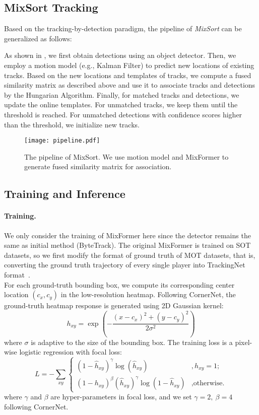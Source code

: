 \documentclass[10pt,twocolumn,letterpaper]{article}
\begin{document}
\subsection{MixSort Tracking}
Based on the tracking-by-detection paradigm, the pipeline of \textit{MixSort} can be generalized as follows:

As shown in , we first obtain detections using an object detector. Then, we employ a motion model (e.g., Kalman Filter) to predict new locations of existing tracks. Based on the new locations and templates of tracks, we compute a fused similarity matrix as described above and use it to associate tracks and detections by the Hungarian Algorithm. Finally, for matched tracks and detections, we update the online templates. For unmatched tracks, we keep them until the threshold is reached. For unmatched detections with confidence scores higher than the threshold, we initialize new tracks.

\begin{figure}[pt]
\centering
\texttt{[image: pipeline.pdf]}
\vspace{-5mm}
\caption{The pipeline of MixSort. We use motion model and MixFormer to generate fused similarity matrix for association.}
\vspace{-5mm}
\label{fig:3}
\end{figure}

\subsection{Training and Inference}
\paragraph{Training.} We only consider the training of MixFormer here since the detector remains the same as initial method (\eg ByteTrack). The original MixFormer is trained on SOT datasets, so we first modify the format of ground truth of MOT datasets, that is, converting the ground truth trajectory of every single player into TrackingNet format~\cite{trackingnet}.\\
\indent For each ground-truth bounding box, we compute its corresponding center location $(c_x,c_y)$ in the low-resolution heatmap. Following CornerNet\cite{law2018cornernet}, the ground-truth heatmap response is generated using 2D Gaussian kernel:
\begin{equation}
	h_{xy}=\exp (-\frac{(x-c_x)^2+(y-c_y)^2}{2\sigma^2})
\end{equation}
where $\sigma$ is adaptive to the size of the bounding box. The training loss is a pixel-wise logistic regression with focal loss\cite{lin2017focal}:
\begin{equation}
	L=-\sum_{xy}\begin{cases}
		(1-\hat h_{xy})^\gamma\log(\hat h_{xy})&, h_{xy}=1;\\
		(1-h_{xy})^\beta(\hat h_{xy})^\gamma\log(1-\hat h_{xy})&,\text{otherwise.}
	\end{cases}
\end{equation}
where $\gamma$ and $\beta$ are hyper-parameters in focal loss, and we set $\gamma=2, \ \beta=4$ following CornerNet.
\end{document}
